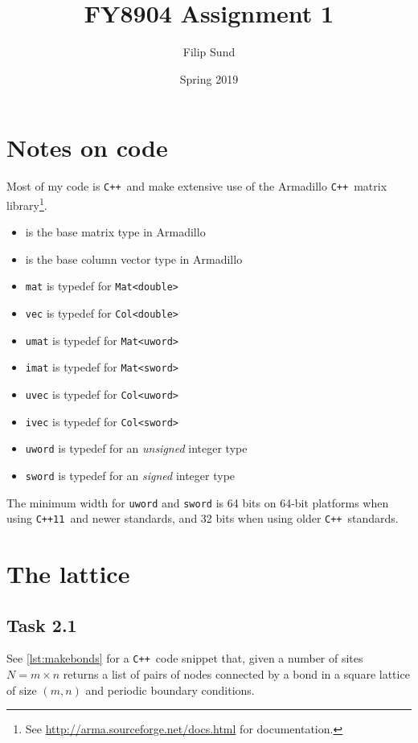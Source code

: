 \documentclass[a4paper]{article}
\title{FY8904 Assignment 1}
\date{Spring 2019}
\author{Filip Sund}
\newcommand{\cpp}{\texttt{C++}}
\newcommand{\cppeleven}{\texttt{C++11}}
\begin{document}
\maketitle

\section*{Notes on code}
Most of my code is \cpp\, and make extensive use of the Armadillo \cpp\ matrix library\footnote{See \url{http://arma.sourceforge.net/docs.html} for documentation.}. 

\begin{itemize}
    \item {} is the base matrix type in Armadillo
    \item {} is the base column vector type in Armadillo
    \item \texttt{mat} is typedef for \texttt{Mat<double>}
    \item \texttt{vec} is typedef for \texttt{Col<double>}
    \item \texttt{umat} is typedef for \texttt{Mat<uword>}
    \item \texttt{imat} is typedef for \texttt{Mat<sword>}
    \item \texttt{uvec} is typedef for \texttt{Col<uword>}
    \item \texttt{ivec} is typedef for \texttt{Col<sword>}
    \item \texttt{uword} is typedef for an \emph{unsigned} integer type
    \item \texttt{sword} is typedef for an \emph{signed} integer type
\end{itemize}
The minimum width for \texttt{uword} and \texttt{sword} is 64 bits on 64-bit platforms when using \cppeleven\ and newer standards, and 32 bits when using older \cpp\ standards.

\setcounter{section}{1}
\section{The lattice}
\subsection*{Task 2.1}
See \cref{lst:makebonds} for a \cpp\ code snippet that, given a number of sites $N = m\times n$ returns a list of pairs of nodes connected by a bond in a square lattice of size $(m, n)$ and periodic boundary conditions. 
\end{document}
